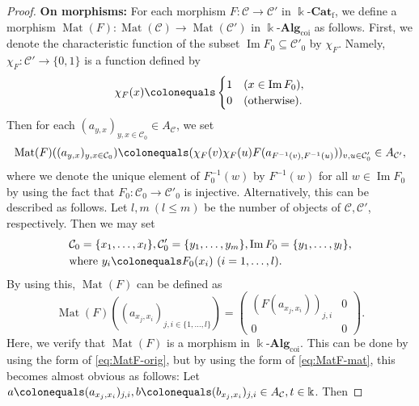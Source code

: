 \documentclass{surv-l}
\numberwithin{equation}{chapter}
\numberwithin{figure}{chapter}
\theoremstyle{plain}
\theoremstyle{definition}
\theoremstyle{remark}
\newcommand{\kCat}{\Bbbk\text{-}\mathbf{Cat}}
\DeclareMathOperator{\Mat}{Mat}
\begin{document}
\begin{proof}
{\bf On morphisms:}
For each morphism $F \colon {\mathcal{C}} \to {\mathcal{C}}'$ in $\kCat_{\mathrm{f}}$,
we define a morphism $\Mat(F)\colon \Mat({\mathcal{C}}) \to \Mat({\mathcal{C}}')$ in
$\Bbbk\text{-}\mathbf{Alg}_{\mathrm{coi}}$ as follows.
First, we denote the characteristic function of the subset $\operatorname{Im} F_0 \subseteq {\mathcal{C}}'_0$ by
$\chi_F$.  Namely,
$\chi_F \colon {\mathcal{C}}' \to \{0,1\}$ is a function defined by
\[
\chi_F(x)\colonequals 
\begin{cases}
1 & (x \in \operatorname{Im} F_0), \\
0 & (\text{otherwise}).
\end{cases}
\]
Then for each $(a_{y,x})_{y,x\in {\mathcal{C}}_0} \in A_{{\mathcal{C}}}$, we set
\begin{equation}\label{eq:MatF-orig}
\Mat(F)((a_{y,x})_{y,x\in {\mathcal{C}}_0})\colonequals  (\chi_F(v)\chi_F(u)F(a_{F^{-1}(v),F^{-1}(u)}))_{v,u \in {\mathcal{C}}'_0} \in A_{{\mathcal{C}}'},
\end{equation}
where we denote the unique element of $F_0^{-1}(w)$ by $F^{-1}(w)$ for all $w \in \operatorname{Im} F_0$
by using the fact that $F_0 \colon {\mathcal{C}}_0 \to {\mathcal{C}}'_0$ is injective.
Alternatively, this can be described as follows.
Let $l,m\ (l \le m)$ be the number of objects of ${\mathcal{C}}, {\mathcal{C}}'$, respectively.
Then we may set
\begin{equation}\label{eq:kikaku}
\begin{aligned}
&{\mathcal{C}}_0 = \{x_1,\dots, x_l\},
{\mathcal{C}}'_0 = \{y_1,\dots, y_m\},
\operatorname{Im} F_0 = \{y_1, \dots, y_l\},\\
&\text{where } y_i\colonequals  F_0(x_i)\ (i= 1,\dots, l).
\end{aligned}
\end{equation}
By using this, $\Mat(F)$ can be defined as
\begin{equation}\label{eq:MatF-mat}
\Mat(F)((a_{x_j,x_i})_{j,i\in \{1,\dots,l\}}) =
\begin{pmatrix} (F(a_{x_j,x_i}))_{j,i} & 0\\0 & 0 \end{pmatrix}.
\end{equation}
Here, we verify that $\Mat(F)$ is a morphism in $\Bbbk\text{-}\mathbf{Alg}_{\mathrm{coi}}$.
This can be done by using the form of \eqref{eq:MatF-orig}, but
by using the form of \eqref{eq:MatF-mat}, this becomes almost obvious as follows:
Let $a\colonequals (a_{x_j,x_i})_{j,i}, b\colonequals (b_{x_j,x_i})_{j,i} \in A_{{\mathcal{C}}}, t \in \Bbbk$.
Then



\end{proof}
\end{document}
